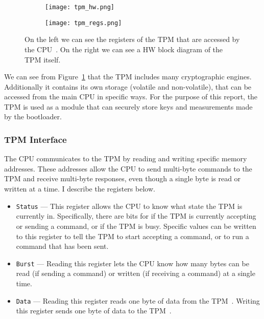 \documentclass[../report.tex]{subfiles}
\def\code#1{\texttt{#1}}
\begin{document}
\begin{figure}
  \centering
\begin{subfigure}{.4\textwidth}
  \centering
  \texttt{[image: tpm\_hw.png]}
\end{subfigure}
\begin{subfigure}{.40\textwidth}
  \centering
  \texttt{[image: tpm\_regs.png]}
\end{subfigure}
\caption{On the left we can see the registers of the TPM that are accessed by the CPU~. On the right we can see a HW block diagram of the TPM itself\cite{tpm-slides}.}
\label{fig:tpm_hw}
\end{figure}

We can see from Figure~\ref{fig:tpm_hw} that the TPM includes many cryptographic engines. 
Additionally it contains its own storage (volatile and non-volatile), that can be accessed from the main CPU in specific ways.
For the purpose of this report, the TPM is used as a module that can securely store keys and measurements made by the bootloader.

\subsubsection{TPM Interface}

The CPU communicates to the TPM by reading and writing specific memory addresses.
These addresses allow the CPU to send multi-byte commands to the TPM and receive multi-byte responses, even though a single byte is read or written at a time.
I describe the registers below.

\begin{itemize}
    \item \code{Status} --- This register allows the CPU to know what state the TPM is currently in. Specifically, there are bits for  if the TPM is currently accepting or sending a command, or if the TPM is busy. Specific values can be written to this register to tell the TPM to start accepting a command, or to run a command that has been sent.
    \item \code{Burst} --- Reading this register lets the CPU know how many bytes can be read (if sending a command) or written (if receiving a command) at a single time.
    \item \code{Data} --- Reading this register reads one byte of data from the TPM~. Writing this register sends one byte of data to the TPM~.
\end{itemize}
\end{document}
